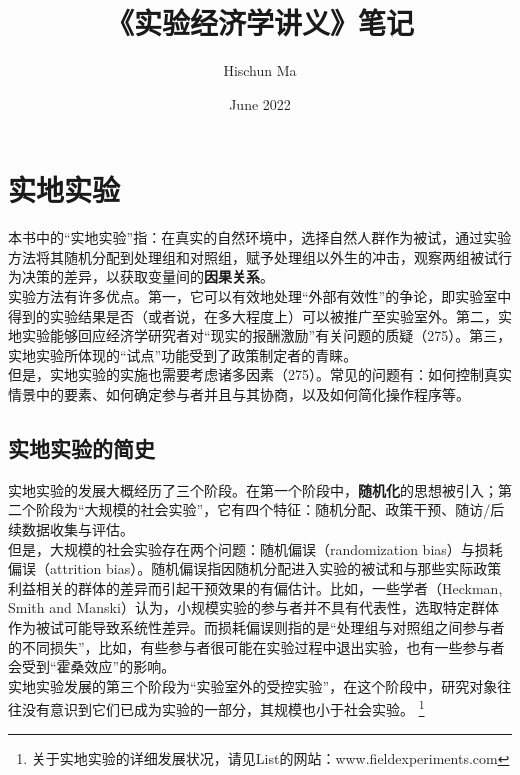 \documentclass[a4paper]{article}
\title{《实验经济学讲义》笔记}
\author{Hischun Ma}
\date{June 2022}
\begin{document}
	
	\maketitle
	\newpage
	\tableofcontents
	\newpage

	\section{实地实验}
	本书中的“实地实验”指：在真实的自然环境中，选择自然人群作为被试，通过实验方法将其随机分配到处理组和对照组，赋予处理组以外生的冲击，观察两组被试行为决策的差异，以获取变量间的\textbf{因果关系}。
	\\[3pt]
	\indent 实验方法有许多优点。第一，它可以有效地处理“外部有效性”的争论，即实验室中得到的实验结果是否（或者说，在多大程度上）可以被推广至实验室外。第二，实地实验能够回应经济学研究者对“现实的报酬激励”有关问题的质疑（275）。第三，实地实验所体现的“试点”功能受到了政策制定者的青睐。
	\\[3pt]
	\indent
	但是，实地实验的实施也需要考虑诸多因素（275）。常见的问题有：如何控制真实情景中的要素、如何确定参与者并且与其协商，以及如何简化操作程序等。
	
	\subsection{实地实验的简史}
	实地实验的发展大概经历了三个阶段。在第一个阶段中，\textbf{随机化}的思想被引入；第二个阶段为“大规模的社会实验”，它有四个特征：随机分配、政策干预、随访/后续数据收集与评估。
	\\[3pt]
	\indent 
	但是，大规模的社会实验存在两个问题：随机偏误（randomization bias）与损耗偏误（attrition bias）。随机偏误指因随机分配进入实验的被试和与那些实际政策利益相关的群体的差异而引起干预效果的有偏估计。比如，一些学者（Heckman, Smith and Manski）认为，小规模实验的参与者并不具有代表性，选取特定群体作为被试可能导致系统性差异。而损耗偏误则指的是“处理组与对照组之间参与者的不同损失”，比如，有些参与者很可能在实验过程中退出实验，也有一些参与者会受到“霍桑效应”的影响。
	\\[3pt]
	\indent
	实地实验发展的第三个阶段为“实验室外的受控实验”，在这个阶段中，研究对象往往没有意识到它们已成为实验的一部分，其规模也小于社会实验。
	\footnote{关于实地实验的详细发展状况，请见List的网站：www.fieldexperiments.com}
	
\end{document}
